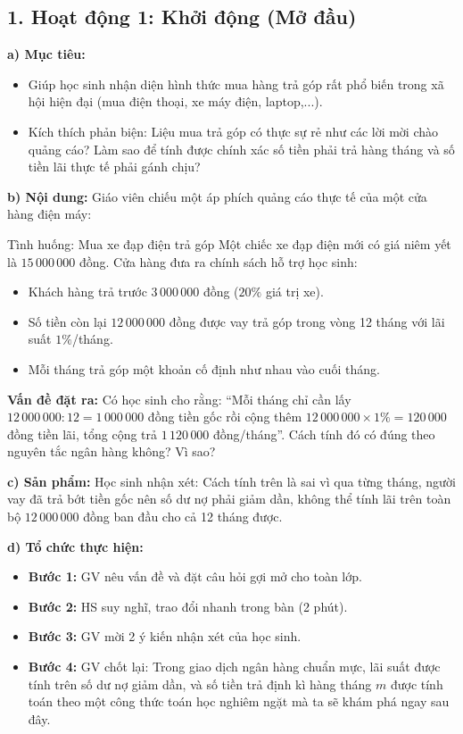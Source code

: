 \documentclass[12pt, a4paper]{article}
\begin{document}
\subsection*{1. Hoạt động 1: Khởi động (Mở đầu)}

\noindent \textbf{a) Mục tiêu:}
\begin{itemize}
    \item Giúp học sinh nhận diện hình thức mua hàng trả góp rất phổ biến trong xã hội hiện đại (mua điện thoại, xe máy điện, laptop,...).
    \item Kích thích phản biện: Liệu mua trả góp có thực sự rẻ như các lời mời chào quảng cáo? Làm sao để tính được chính xác số tiền phải trả hàng tháng và số tiền lãi thực tế phải gánh chịu?
\end{itemize}

\noindent \textbf{b) Nội dung:}
Giáo viên chiếu một áp phích quảng cáo thực tế của một cửa hàng điện máy:
\begin{pedabox}{Tình huống: Mua xe đạp điện trả góp}
    Một chiếc xe đạp điện mới có giá niêm yết là $15\,000\,000$ đồng. Cửa hàng đưa ra chính sách hỗ trợ học sinh:
    \begin{itemize}
        \item Khách hàng trả trước $3\,000\,000$ đồng ($20\%$ giá trị xe).
        \item Số tiền còn lại $12\,000\,000$ đồng được vay trả góp trong vòng 12 tháng với lãi suất $1\%$/tháng.
        \item Mỗi tháng trả góp một khoản cố định như nhau vào cuối tháng.
    \end{itemize}
    \textbf{Vấn đề đặt ra:} Có học sinh cho rằng: ``Mỗi tháng chỉ cần lấy $12\,000\,000 : 12 = 1\,000\,000$ đồng tiền gốc rồi cộng thêm $12\,000\,000 \times 1\% = 120\,000$ đồng tiền lãi, tổng cộng trả $1\,120\,000$ đồng/tháng''. Cách tính đó có đúng theo nguyên tắc ngân hàng không? Vì sao?
\end{pedabox}

\noindent \textbf{c) Sản phẩm:}
Học sinh nhận xét: Cách tính trên là sai vì qua từng tháng, người vay đã trả bớt tiền gốc nên số dư nợ phải giảm dần, không thể tính lãi trên toàn bộ $12\,000\,000$ đồng ban đầu cho cả 12 tháng được.

\noindent \textbf{d) Tổ chức thực hiện:}
\begin{itemize}
    \item \textbf{Bước 1:} GV nêu vấn đề và đặt câu hỏi gợi mở cho toàn lớp.
    \item \textbf{Bước 2:} HS suy nghĩ, trao đổi nhanh trong bàn (2 phút).
    \item \textbf{Bước 3:} GV mời 2 ý kiến nhận xét của học sinh.
    \item \textbf{Bước 4:} GV chốt lại: Trong giao dịch ngân hàng chuẩn mực, lãi suất được tính trên số dư nợ giảm dần, và số tiền trả định kì hàng tháng $m$ được tính toán theo một công thức toán học nghiêm ngặt mà ta sẽ khám phá ngay sau đây.
\end{itemize}
\end{document}
